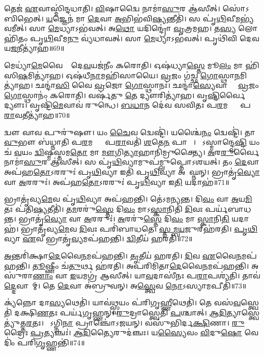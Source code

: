 𑌤𑍇𑌜॑ \ul{𑌏}𑌵𑌾𑌸𑍍𑌮𑌿॑𑌨𑍍𑌦𑌧𑌾𑌤𑌿।
\ul{𑌵𑌿}𑌷𑌾𑌦𑍍𑌵𑍈 𑌨𑌾𑌮𑌾॑\ul{𑌸𑍁}𑌰 𑌆॑𑌸𑍀𑌤𑍍।
𑌸𑍋॑𑌽𑌬𑌿𑌭𑍇𑌤𑍍।
\ul{𑌯}𑌜𑍍𑌞𑍇𑌨॑ 𑌮𑌾 \ul{𑌦𑍇}𑌵𑌾 \ul{𑌅}𑌭𑌿𑌭॑𑌵𑌿\ul{𑌷𑍍𑌯}𑌨𑍍𑌤𑍀𑌤𑌿॑।
𑌸 𑌪𑍃॑\ul{𑌥𑌿}𑌵𑍀\ul{𑌮}𑌭𑍍𑌯॑𑌵𑌮𑍀𑌤𑍍।
𑌸𑌾 \ul{𑌮𑍇}𑌧𑍍𑌯𑌾\-𑌽𑌭॑𑌵𑌤𑍍।
𑌅\ul{𑌥𑍋} 𑌯𑌦𑌿𑌨𑍍𑌦𑍍𑌰𑍋॑ \ul{𑌵𑍃}𑌤𑍍𑌰𑌮𑌹\sn{}।
𑌤\ul{𑌸𑍍𑌯} 𑌲𑍋𑌹𑌿॑𑌤𑌂 𑌪𑍃\ul{𑌥𑌿}𑌵𑍀𑌮\ul{𑌨𑍁} 𑌵𑍍𑌯॑𑌧𑌾𑌵𑌤𑍍।
𑌸𑌾 \ul{𑌮𑍇}𑌧𑍍𑌯𑌾\-𑌽𑌭॑𑌵𑌤𑍍।
𑌪𑍃𑌥𑌿॑𑌵𑌿 𑌦𑍇𑌵𑌯\ul{𑌜}𑌨𑍀𑌤𑍍𑌯𑌾॑𑌹॥69॥

𑌮𑍇𑌧𑍍𑌯𑌾॑\ul{𑌮𑍇}𑌵𑍈𑌨𑌾𑌂᳚ 𑌦𑍇\ul{𑌵}𑌯𑌜॑𑌨𑍀𑌂 𑌕𑌰𑍋𑌤𑌿।
𑌓𑌷॑𑌧𑍍𑌯𑌾\ul{𑌸𑍍𑌤𑍇} 𑌮𑍂\ul{𑌲𑌂} 𑌮𑌾 𑌹𑌿॑𑌸𑌿\ul{𑌷}𑌮𑌿𑌤𑍍𑌯𑌾॑𑌹।
𑌓𑌷॑𑌧𑍀\ul{𑌨𑌾}𑌮𑌹𑌿॑𑌸𑌾𑌯𑍈।
\ul{𑌵𑍍𑌰}𑌜𑌂 𑌗॑𑌚𑍍𑌛 \ul{𑌗𑍋}𑌸𑍍𑌥𑌾\ul{𑌨}𑌮𑌿𑌤𑍍𑌯𑌾॑𑌹।
𑌛𑌨𑍍𑌦𑌾॑\ul{𑌸𑌿} 𑌵𑍈 \ul{𑌵𑍍𑌰}𑌜𑍋 \ul{𑌗𑍋}𑌸𑍍𑌥𑌾𑌨𑌃॑।
𑌛𑌨𑍍𑌦𑌾॑\ul{𑌸𑍍𑌯𑍇}𑌵𑌾𑌸𑍍𑌮𑍈᳚ \ul{𑌵𑍍𑌰}𑌜𑌂 \ul{𑌗𑍋}𑌸𑍍𑌥𑌾𑌨𑌂॑ 𑌕𑌰𑍋𑌤𑌿।
𑌵𑌰𑍍\mbox{}𑌷॑𑌤𑍁 \ul{𑌤𑍇} 𑌦𑍍𑌯𑍗𑌰𑌿𑌤𑍍𑌯𑌾॑𑌹।
𑌵𑍃\ul{𑌷𑍍𑌟𑌿}𑌰𑍍𑌵𑍈 𑌦𑍍𑌯𑍗𑌃।
𑌵𑍃𑌷𑍍𑌟𑌿॑\ul{𑌮𑍇}𑌵𑌾𑌵॑ 𑌰𑍁𑌨𑍍𑌧𑍇।
\ul{𑌬}\ul{𑌧𑌾}𑌨 𑌦𑍇॑𑌵 𑌸𑌵𑌿𑌤𑌃 𑌪\ul{𑌰}𑌮𑌸𑍍𑌯𑌾𑌂᳚ 𑌪\ul{𑌰𑌾}𑌵𑌤𑍀𑌤𑍍𑌯𑌾॑𑌹॥70॥

𑌦𑍍𑌵𑍗 𑌵𑌾𑌵 𑌪𑍁𑌰𑍁॑𑌷𑍗।
𑌯𑌂 \ul{𑌚𑍈}𑌵 𑌦𑍍𑌵𑍇𑌷𑍍𑌟𑌿॑।
𑌯𑌶𑍍𑌚𑍈॑\ul{𑌨𑌂} 𑌦𑍍𑌵𑍇𑌷𑍍𑌟𑌿॑।
𑌤𑌾\ul{𑌵𑍁}𑌭𑍗 𑌬॑𑌧𑍍𑌨𑌾𑌤𑌿 𑌪\ul{𑌰}𑌮𑌸𑍍𑌯𑌾𑌂᳚ 𑌪\ul{𑌰𑌾}𑌵𑌤𑌿॑ \ul{𑌶}𑌤𑍇\ul{𑌨} 𑌪𑌾𑌶𑍈𑌃᳚।
𑌯𑍋᳚𑌽𑌸𑍍𑌮𑌾𑌨𑍍𑌦𑍍𑌵𑍇\ul{𑌷𑍍𑌟𑌿} 𑌯𑌂 𑌚॑ \ul{𑌵}𑌯𑌂 \ul{𑌦𑍍𑌵𑌿}𑌷𑍍𑌮𑌸𑍍𑌤𑌮\ul{𑌤𑍋} 𑌮𑌾 \ul{𑌮𑍗}𑌗𑌿\ul{𑌤𑍍𑌯𑌾}𑌹𑌾𑌨𑌿॑𑌮𑍍𑌰𑍁𑌕𑍍𑌤𑍍𑌯𑍈।
\ul{𑌅}𑌰\ul{𑌰𑍁}𑌰𑍍𑌵𑍈 𑌨𑌾𑌮𑌾॑\ul{𑌸𑍁}𑌰 𑌆॑𑌸𑍀𑌤𑍍।
𑌸 𑌪𑍃॑\ul{𑌥𑌿}𑌵𑍍𑌯𑌾𑌮𑍁𑌪॑𑌮𑍍𑌲𑍁𑌪𑍍𑌤𑍋\-𑌽𑌶𑌯𑌤𑍍।
𑌤𑌂 \ul{𑌦𑍇}𑌵𑌾 𑌅𑌪॑𑌹\ul{𑌤𑍋}\-𑌽𑌰𑌰𑍁𑌃॑ 𑌪𑍃\ul{𑌥𑌿}𑌵𑍍𑌯𑌾 𑌇𑌤𑌿॑ 𑌪𑍃\ul{𑌥𑌿}𑌵𑍍𑌯𑌾 𑌅𑌪𑌾᳚𑌘𑍍𑌨𑌨𑍍।
𑌭𑍍𑌰𑌾𑌤𑍃॑\ul{𑌵𑍍𑌯𑍋} 𑌵𑌾 \ul{𑌅}𑌰𑌰𑍁𑌃॑।
𑌅𑌪॑𑌹\ul{𑌤𑍋}\-𑌽𑌰𑌰𑍁𑌃॑ 𑌪𑍃\ul{𑌥𑌿}𑌵𑍍𑌯𑌾 𑌇\ul{𑌤𑌿} 𑌯𑌦𑌾𑌹॑॥71॥

𑌭𑍍𑌰𑌾𑌤𑍃॑𑌵𑍍𑌯\ul{𑌮𑍇}𑌵 𑌪𑍃॑\ul{𑌥𑌿}𑌵𑍍𑌯𑌾 𑌅𑌪॑𑌹𑌨𑍍𑌤𑌿।
𑌤𑍇॑𑌽𑌮𑌨𑍍𑌯𑌨𑍍𑌤।
𑌦𑌿\ul{𑌵𑌂} 𑌵𑌾 \ul{𑌅}𑌯\ul{𑌮𑌿}𑌤𑌃 𑌪॑𑌤𑌿\ul{𑌷𑍍𑌯}𑌤𑍀𑌤𑌿॑।
𑌤\ul{𑌮}𑌰𑌰𑍁॑\ul{𑌸𑍍𑌤𑍇} 𑌦𑌿\ul{𑌵𑌂} 𑌮𑌾𑌽\ul{𑌸𑍍𑌕𑌾}𑌨𑌿𑌤𑌿॑ \ul{𑌦𑌿}𑌵𑌃 𑌪𑌰𑍍𑌯॑𑌬𑌾𑌧𑌨𑍍𑌤।
𑌭𑍍𑌰𑌾𑌤𑍃॑\ul{𑌵𑍍𑌯𑍋} 𑌵𑌾 \ul{𑌅}𑌰𑌰𑍁𑌃॑।
\ul{𑌅}𑌰𑌰𑍁॑\ul{𑌸𑍍𑌤𑍇} 𑌦𑌿\ul{𑌵𑌂} 𑌮𑌾 \ul{𑌸𑍍𑌕𑌾}𑌨𑌿\ul{𑌤𑌿} 𑌯𑌦𑌾𑌹॑।
𑌭𑍍𑌰𑌾𑌤𑍃॑𑌵𑍍𑌯\ul{𑌮𑍇}𑌵 \ul{𑌦𑌿}𑌵𑌃 𑌪𑌰𑌿॑𑌬𑌾𑌧𑌤𑍇।
\ul{𑌸𑍍𑌤}\ul{𑌮𑍍𑌬}\ul{𑌯}𑌜𑍁𑌰𑍍‌\mbox{}𑌹॑𑌰𑌤𑌿।
\ul{𑌪𑍃}\ul{𑌥𑌿}𑌵𑍍𑌯𑌾 \ul{𑌏}𑌵 𑌭𑍍𑌰𑌾𑌤𑍃॑\ul{𑌵𑍍𑌯}𑌮𑌪॑𑌹𑌨𑍍𑌤𑌿।
\ul{𑌦𑍍𑌵𑌿}𑌤𑍀𑌯॑ 𑌹𑌰𑌤𑌿॥72॥

\ul{𑌅}𑌨𑍍𑌤𑌰𑌿॑𑌕𑍍𑌷𑌾\ul{𑌦𑍇}𑌵𑍈\ul{𑌨}𑌮𑌪॑𑌹𑌨𑍍𑌤𑌿।
\ul{𑌤𑍃}𑌤𑍀𑌯॑ 𑌹𑌰𑌤𑌿।
\ul{𑌦𑌿}𑌵 \ul{𑌏}𑌵𑍈\ul{𑌨}𑌮𑌪॑𑌹𑌨𑍍𑌤𑌿।
\ul{𑌤𑍂}𑌷𑍍𑌣𑍀𑌂 𑌚॑\ul{𑌤𑍁}𑌰𑍍𑌥 𑌹॑𑌰𑌤𑌿।
𑌅𑌪॑𑌰𑌿𑌮𑌿𑌤𑌾\ul{𑌦𑍇}𑌵𑍈\ul{𑌨}𑌮𑌪॑\-𑌹𑌨𑍍𑌤𑌿।
𑌅𑌸𑍁॑𑌰𑌾\ul{𑌣𑌾𑌂} 𑌵𑌾 \ul{𑌇}𑌯𑌮𑌗𑍍𑌰॑ 𑌆𑌸𑍀𑌤𑍍।
𑌯𑌾\ul{𑌵}𑌦𑌾𑌸𑍀॑𑌨𑌃 𑌪\ul{𑌰𑌾}𑌪𑌶𑍍𑌯॑𑌤𑌿।
𑌤𑌾𑌵॑\ul{𑌦𑍍𑌦𑍇}𑌵𑌾𑌨𑌾᳚𑌮𑍍।
𑌤𑍇 \ul{𑌦𑍇}𑌵𑌾 𑌅॑𑌬𑍍𑌰𑍁𑌵𑌨𑍍।
𑌅\ul{𑌸𑍍𑌤𑍍𑌵𑍇}𑌵 \ul{𑌨𑍋}\-𑌽𑌸𑍍𑌯𑌾𑌮𑌪𑍀𑌤𑌿॑॥73॥

𑌕𑍍𑌯॑𑌨𑍍𑌨𑍋 𑌦𑌾\ul{𑌸𑍍𑌯}𑌥𑍇𑌤𑌿॑।
𑌯𑌾𑌵॑\ul{𑌥𑍍𑌸𑍍𑌵}𑌯𑌂 𑌪॑𑌰𑌿𑌗𑍃\ul{𑌹𑍍𑌣𑍀}𑌥𑍇𑌤𑌿॑।
𑌤𑍇 𑌵𑌸॑\ul{𑌵}𑌸𑍍𑌤𑍍𑌵𑍇𑌤𑌿॑ 𑌦𑌕𑍍𑌷𑌿\ul{𑌣}𑌤𑌃 𑌪𑌰𑍍𑌯॑𑌗𑍃𑌹𑍍𑌣𑌨𑍍।
\ul{𑌰𑍁}𑌦𑍍𑌰𑌾𑌸𑍍𑌤𑍍𑌵𑍇𑌤𑌿॑ \ul{𑌪}𑌶𑍍𑌚𑌾𑌤𑍍।
\ul{𑌆}\ul{𑌦𑌿}𑌤𑍍𑌯𑌾𑌸𑍍𑌤𑍍𑌵𑍇𑌤𑍍𑌯𑍁॑𑌤𑍍𑌤\ul{𑌰}𑌤𑌃।
𑌤𑍇᳚𑌽𑌗𑍍𑌨𑌿\ul{𑌨𑌾} 𑌪𑍍𑌰𑌾𑌞𑍍𑌚𑍋॑\-𑌽𑌜𑌯𑌨𑍍।
𑌵𑌸𑍁॑𑌭𑌿𑌰𑍍𑌦\ul{𑌕𑍍𑌷𑌿}𑌣𑌾।
\ul{𑌰𑍁}𑌦𑍍𑌰𑍈𑌃 \ul{𑌪𑍍𑌰}𑌤𑍍𑌯𑌞𑍍𑌚𑌃॑।
\ul{𑌆}\ul{𑌦𑌿}𑌤𑍍𑌯𑍈𑌰𑍁𑌦॑𑌞𑍍𑌚𑌃।
𑌯\ul{𑌸𑍍𑌯𑍈}𑌵𑌂 \ul{𑌵𑌿}𑌦𑍁\ul{𑌷𑍋} 𑌵𑍇𑌦𑌿𑌂॑ 𑌪𑌰𑌿\ul{𑌗𑍃}𑌹𑍍𑌣𑌨𑍍𑌤𑌿॑॥74॥

